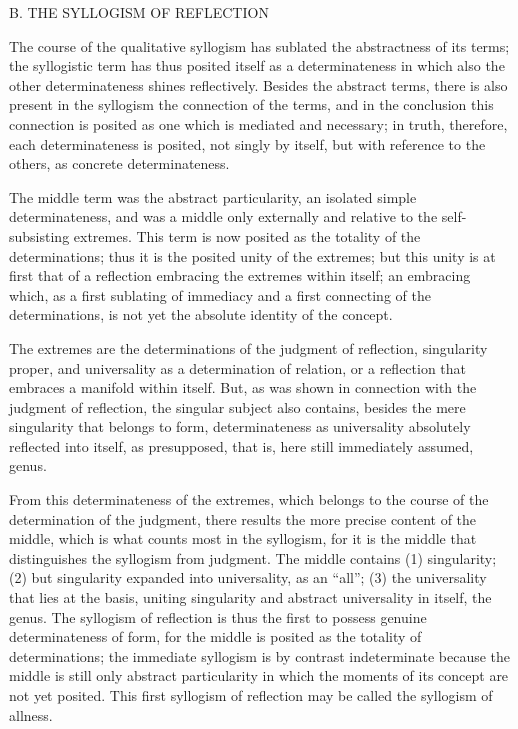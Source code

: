 B. THE SYLLOGISM OF REFLECTION

The course of the qualitative syllogism has sublated
the abstractness of its terms;
the syllogistic term has thus posited itself as
a determinateness in which also
the other determinateness shines reflectively.
Besides the abstract terms,
there is also present in the syllogism
the connection of the terms,
and in the conclusion this connection is
posited as one which is mediated and necessary;
in truth, therefore, each determinateness is posited,
not singly by itself,
but with reference to the others,
as concrete determinateness.

The middle term was the abstract particularity,
an isolated simple determinateness,
and was a middle only externally
and relative to the self-subsisting extremes.
This term is now posited as the totality of the determinations;
thus it is the posited unity of the extremes;
but this unity is at first that of a reflection
embracing the extremes within itself;
an embracing which, as a first sublating of immediacy
and a first connecting of the determinations,
is not yet the absolute identity of the concept.

The extremes are the determinations of
the judgment of reflection, singularity proper,
and universality as a determination of relation,
or a reflection that embraces a manifold within itself.
But, as was shown in connection with the judgment of reflection,
the singular subject also contains,
besides the mere singularity that belongs to form,
determinateness as universality absolutely reflected into itself,
as presupposed, that is, here still immediately assumed, genus.

From this determinateness of the extremes,
which belongs to the course of the determination of the judgment,
there results the more precise content of the middle,
which is what counts most in the syllogism,
for it is the middle that distinguishes
the syllogism from judgment.
The middle contains
(1) singularity;
(2) but singularity expanded into universality, as an “all”;
(3) the universality that lies at the basis,
uniting singularity and abstract universality in itself, the genus.
The syllogism of reflection is thus the first
to possess genuine determinateness of form,
for the middle is posited as the totality of determinations;
the immediate syllogism is by contrast indeterminate
because the middle is still only abstract particularity
in which the moments of its concept are not yet posited.
This first syllogism of reflection may be called
the syllogism of allness.

